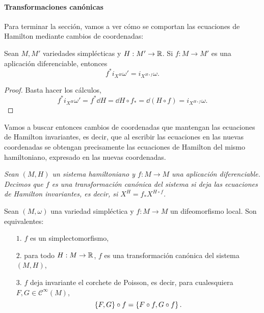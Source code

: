 \paragraph{\bf Transformaciones canónicas}\mbox{}

  Para terminar la sección, vamos a ver cómo se comportan las ecuaciones de Hamilton mediante cambios de coordenadas:
  \begin{prop}\label{cambiodif}
 Sean $M,M'$ variedades simplécticas y $H:M'\rightarrow \mathbb{R}$. Si $f:M\rightarrow M'$ es una aplicación diferenciable, entonces 
 \begin{equation*}
   f^*i_{X^H}\omega'=i_{X^{H\circ f}}\omega.
 \end{equation*}
\end{prop}
\begin{proof}
  Basta hacer los cálculos,
  \begin{equation*}
    f^*i_{X^H}\omega'=f^*\dd H=\dd H \circ f_* = \dd (H\circ f)=i_{X^{H\circ f}}\omega.
  \end{equation*}
\end{proof}
Vamos a buscar entonces cambios de coordenadas que mantengan las ecuaciones de Hamilton invariantes, es decir, que al escribir las ecuaciones en las nuevas coordenadas se obtengan precisamente las ecuaciones de Hamilton del mismo hamiltoniano, expresado en las nuevas coordenadas.
\begin{defn}
  \em
  Sean $(M,H)$ un sistema hamiltoniano y $f:M\rightarrow M$ una aplicación diferenciable. Decimos que $f$ es una \emph{transformación canónica} del sistema si deja las ecuaciones de Hamilton invariantes, es decir, si $X^H=f_*X^{H\circ f}$.
\end{defn}

\begin{prop}\label{cambiohamilton}
  Sean $(M,\omega)$ una variedad simpléctica y $f:M\rightarrow M$ un difeomorfismo local. Son equivalentes:
  \begin{enumerate}
    \item[$1$.] $f$ es un simplectomorfismo,
    \item[$2$.] para todo $H:M\rightarrow \mathbb{R}$, $f$ es una transformación canónica del sistema $(M,H)$,
    \item[$3$.] $f$ deja invariante el corchete de Poisson, es decir, para cualesquiera $F,G\in \mathscr{C}^{\infty}(M)$, 
      \begin{equation*}
	\left\lbrace F,G\right\rbrace\circ f=\left\lbrace F\circ f,G\circ f\right\rbrace.
      \end{equation*}
  \end{enumerate}
\end{prop}

